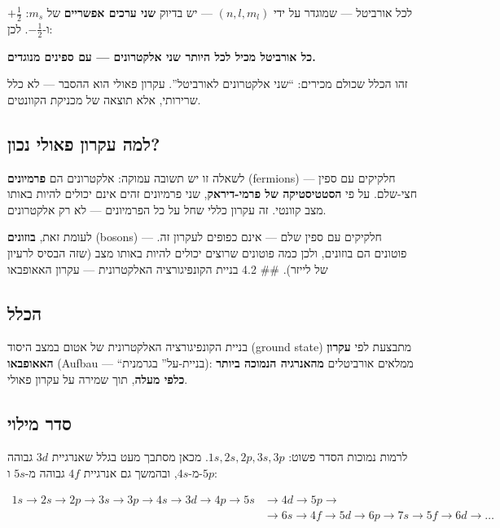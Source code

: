 \documentclass[
  hebrew,
  letterpaper,
  DIV=11,
  numbers=noendperiod]{scrreprt}
\begin{document}
לכל אורביטל --- שמוגדר על ידי \((n, l, m_l)\) --- יש בדיוק \textbf{שני
ערכים אפשריים} של \(m_s\): \(+\frac{1}{2}\) ו-\(-\frac{1}{2}\). לכן:

\textbf{כל אורביטל מכיל לכל היותר שני אלקטרונים --- עם ספינים מנוגדים.}

זהו הכלל שכולם מכירים: ``שני אלקטרונים לאורביטל''. עקרון פאולי הוא ההסבר
--- לא כלל שרירותי, אלא תוצאה של מכניקת הקוונטים.

\subsection{למה עקרון פאולי
נכון?}\label{ux5dcux5deux5d4-ux5e2ux5e7ux5e8ux5d5ux5df-ux5e4ux5d0ux5d5ux5dcux5d9-ux5e0ux5dbux5d5ux5df}

לשאלה זו יש תשובה עמוקה: אלקטרונים הם \textbf{פרמיונים} (fermions) ---
חלקיקים עם ספין חצי-שלם. על פי \textbf{הסטטיסטיקה של פרמי-דיראק}, שני
פרמיונים זהים אינם יכולים להיות באותו מצב קוונטי. זה עקרון כללי שחל על
כל הפרמיונים --- לא רק אלקטרונים.

לעומת זאת, \textbf{בוזונים} (bosons) --- חלקיקים עם ספין שלם --- אינם
כפופים לעקרון זה. פוטונים הם בוזונים, ולכן כמה פוטונים שרוצים יכולים
להיות באותו מצב (שזה הבסיס לרעיון של לייזר). \#\# 4.2 בניית הקונפיגורציה
האלקטרונית --- עקרון האאופבאו

\subsection{הכלל}\label{ux5d4ux5dbux5dcux5dc}

בניית הקונפיגורציה האלקטרונית של אטום במצב היסוד (ground state) מתבצעת
לפי \textbf{עקרון האאופבאו} (Aufbau --- ``בניית-על'' בגרמנית): ממלאים
אורביטלים \textbf{מהאנרגיה הנמוכה ביותר כלפי מעלה}, תוך שמירה על עקרון
פאולי.

\subsection{סדר מילוי}\label{ux5e1ux5d3ux5e8-ux5deux5d9ux5dcux5d5ux5d9}

לרמות נמוכות הסדר פשוט: \(1s, 2s, 2p, 3s, 3p\). מכאן מסתבך מעט בגלל
שאנרגיית \(3d\) גבוהה מ-\(4s\), ובהמשך גם אנרגיית \(4f\) גבוהה מ-\(5s\)
ו-\(5p\):

\begin{align*}
1s \to 2s \to 2p \to 3s \to 3p \to 4s \to 3d \to 4p \to 5s &\to 4d \to 5p \to \\
&\to 6s \to 4f \to 5d \to 6p \to 7s \to 5f \to 6d \to \ldots
\end{align*}
\end{document}
